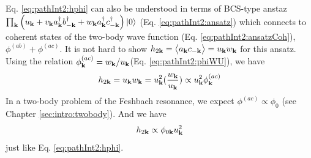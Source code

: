 Eq. \ref{eq:pathInt2:hphi} can also be understood in terms of BCS-type anstaz $\prod_{\mathbf{k}}\left(u_{\mathbf{k}}+v_{\mathbf{k}}{}a^{\dagger}_{\mathbf{k}}{}b^{\dagger}_{-\mathbf{k}}+w_{\mathbf{k}}{}a^{\dagger}_{\mathbf{k}}{}c^{\dagger}_{-\mathbf{k}}\right)\left|0\right>$ (Eq. \ref{eq:pathInt2:ansatz}) which connects to coherent states of the two-body wave function (Eq. \ref{eq:pathInt2:ansatzCoh}), $\phi^{(ab)}+\phi^{(ac)}$.   It is not hard to show  $h_{2\mathbf{k}}=\bigl<{a_{\mathbf{k}}c_{-\mathbf{k}}}\bigr>=u_{\mathbf{k}}w_{\mathbf{k}}$ for this ansatz. Using the relation $\phi^{(ac)}_{\mathbf{k}}=w_{\mathbf{k}}/u_{\mathbf{k}}$(Eq. \ref{eq:pathInt2:phiWU}),  we have
\begin{equation}
h_{2\mathbf{k}}=u_{\mathbf{k}}w_{\mathbf{k}}=u_{\mathbf{k}}^{2}(\frac{w_{\mathbf{k}}}{u_{\mathbf{k}}})\propto{}u_{\mathbf{k}}^{2}\phi^{(ac)}_{\mathbf{k}}
\end{equation}
 In a two-body problem of the Feshbach resonance, we expect $\phi^{(ac)}\propto\phi_{0}$  (see Chapter \ref{sec:intro:twobody}).
 And we have 
 \begin{equation}
 h_{2\mathbf{k}}\propto\phi_{0\mathbf{k}}u_{\mathbf{k}}^{2}
 \end{equation}
just like Eq. \ref{eq:pathInt2:hphi}.



